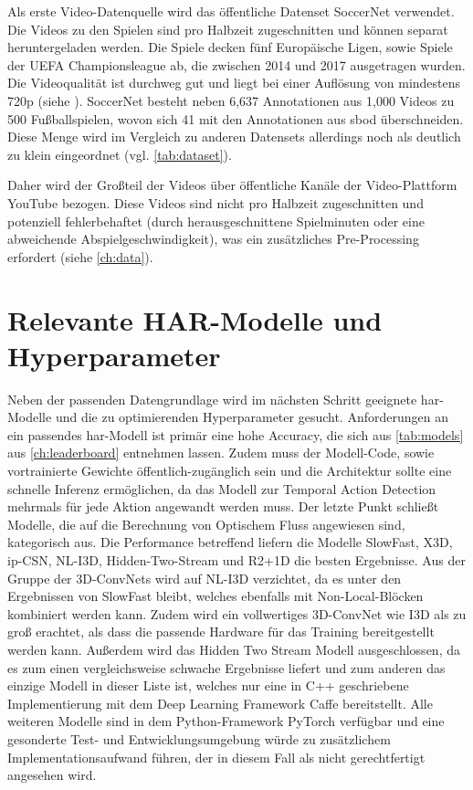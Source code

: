 Als erste Video-Datenquelle wird das öffentliche Datenset SoccerNet verwendet.
Die Videos zu den Spielen sind pro Halbzeit zugeschnitten und können separat heruntergeladen werden.
Die Spiele decken fünf Europäische Ligen, sowie Spiele der UEFA Championsleague ab, die zwischen 2014 und 2017 ausgetragen wurden.
Die Videoqualität ist durchweg gut und liegt bei einer Auflösung von mindestens 720p (siehe \cite{SoccerNet20}).
SoccerNet besteht neben 6,637 Annotationen aus 1,000 Videos zu 500 Fußballspielen, wovon sich 41 mit den Annotationen aus \gls{sbod} überschneiden.
Diese Menge wird im Vergleich zu anderen Datensets allerdings noch als deutlich zu klein eingeordnet (vgl. \autoref{tab:dataset}).

Daher wird der Großteil der Videos über öffentliche Kanäle der Video-Plattform YouTube bezogen.
Diese Videos sind nicht pro Halbzeit zugeschnitten und potenziell fehlerbehaftet (\zB durch herausgeschnittene Spielminuten oder eine abweichende Abspielgeschwindigkeit), was ein zusätzliches Pre-Processing erfordert (siehe \autoref{ch:data}).

\section{Relevante HAR-Modelle und Hyperparameter}
\label{sec:decisions}

Neben der passenden Datengrundlage wird im nächsten Schritt geeignete \gls{har}-Modelle und die zu optimierenden Hyperparameter gesucht.
Anforderungen an ein passendes \gls{har}-Modell ist primär eine hohe Accuracy, die sich aus \autoref{tab:models} aus \autoref{ch:leaderboard} entnehmen lassen.
Zudem muss der Modell-Code, sowie vortrainierte Gewichte öffentlich-zugänglich sein und die Architektur sollte eine schnelle Inferenz ermöglichen, da das Modell zur Temporal Action Detection mehrmals für jede Aktion angewandt werden muss.
Der letzte Punkt schließt Modelle, die auf die Berechnung von Optischem Fluss angewiesen sind, kategorisch aus.
Die Performance betreffend liefern die Modelle SlowFast, X3D, ip-CSN, NL-I3D, Hidden-Two-Stream und R2+1D die besten Ergebnisse.
Aus der Gruppe der 3D-ConvNets wird auf NL-I3D verzichtet, da es unter den Ergebnissen von SlowFast bleibt, welches ebenfalls mit Non-Local-Blöcken kombiniert werden kann.
Zudem wird ein vollwertiges 3D-ConvNet wie I3D als zu groß erachtet, als dass die passende Hardware für das Training bereitgestellt werden kann.
Außerdem wird das Hidden Two Stream Modell ausgeschlossen, da es zum einen vergleichsweise schwache Ergebnisse liefert und zum anderen das einzige Modell in dieser Liste ist, welches nur eine in C++ geschriebene Implementierung mit dem Deep Learning Framework Caffe \cite{Jia14} bereitstellt.
Alle weiteren Modelle sind in dem Python-Framework PyTorch \cite{Paszke19} verfügbar und eine gesonderte Test- und Entwicklungsumgebung würde zu zusätzlichem Implementationsaufwand führen, der in diesem Fall als nicht gerechtfertigt angesehen wird.

